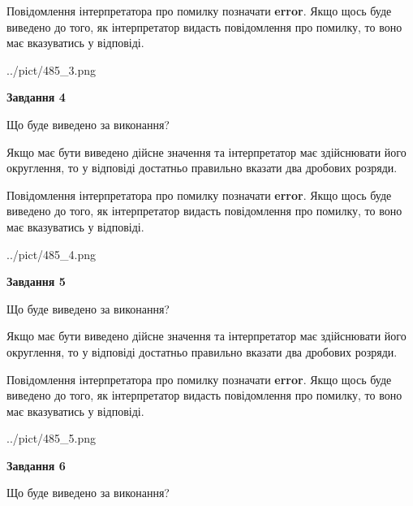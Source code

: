 \documentclass[12pt, ukrainian]{article}
\begin{document}
{\begin {Large}
Повідомлення інтерпретатора про помилку позначати \textbf{error}.
Якщо щось буде виведено до того, як інтерпретатор видасть повідомлення про помилку, 
то воно має вказуватись у відповіді. \par

\begin{center}
	{../pict/485_3.png}
\end{center}
\newpage

{\begin {center}\textbf{Завдання 4}\end {center}}\par
Що буде виведено за виконання? \par

Якщо має бути виведено дійсне значення та інтерпретатор має здійснювати його округлення, 
то у відповіді достатньо правильно вказати два дробових розряди.

Повідомлення інтерпретатора про помилку позначати \textbf{error}.
Якщо щось буде виведено до того, як інтерпретатор видасть повідомлення про помилку, 
то воно має вказуватись у відповіді. \par

\begin{center}
	{../pict/485_4.png}
\end{center}
\newpage

{\begin {center}\textbf{Завдання 5}\end {center}}\par
Що буде виведено за виконання? \par

Якщо має бути виведено дійсне значення та інтерпретатор має здійснювати його округлення, 
то у відповіді достатньо правильно вказати два дробових розряди.

Повідомлення інтерпретатора про помилку позначати \textbf{error}.
Якщо щось буде виведено до того, як інтерпретатор видасть повідомлення про помилку, 
то воно має вказуватись у відповіді. \par

\begin{center}
	{../pict/485_5.png}
\end{center}
\newpage

{\begin {center}\textbf{Завдання 6}\end {center}}\par
Що буде виведено за виконання? \par


\end{Large}}
\end{document}
